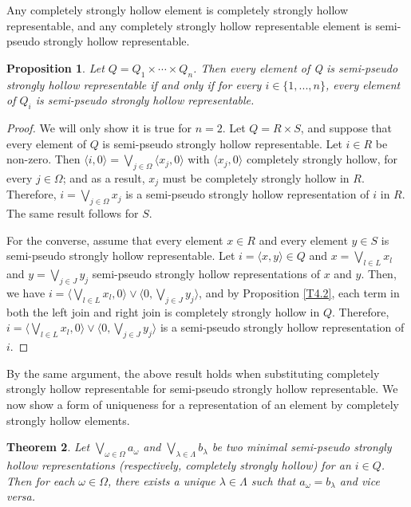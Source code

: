 \documentclass[11pt,english]{amsart}
\newtheorem{theorem}{Theorem}[section]
\newtheorem{proposition}[theorem]{Proposition}
\theoremstyle{definition}
\numberwithin{equation}{section}
\theoremstyle{remark}
\begin{document}
	Any completely strongly hollow element is completely strongly hollow representable, and any completely strongly hollow representable element is semi-pseudo strongly hollow representable.
	
	\begin{proposition}
		Let $Q=Q_1\times\cdots \times Q_n$. Then every element of Q is semi-pseudo strongly hollow representable if and only if for every $i\in\{1,...,n\}$, every element of $Q_i$ is semi-pseudo strongly hollow representable.
	\end{proposition}
	
	\begin{proof}
		We will only show it is true for $n=2$. Let $Q=R\times S$, and suppose that every element of $Q$ is semi-pseudo strongly hollow representable. Let $i\in R$ be non-zero. Then $\langle i,0\rangle=\bigvee_{j\in \Omega} \langle x_j,0\rangle $ with $\langle x_j,0\rangle$ completely strongly hollow, for every $j\in \Omega$; and as a result, $x_j$ must be completely strongly hollow in $R$. Therefore, $i=\bigvee_{j\in \Omega}x_j$ is a semi-pseudo strongly hollow representation of $i$ in $R$. The same result follows for $S$. 
		
		For the converse, assume that every element $x\in R$ and every element $y\in S$ is semi-pseudo strongly hollow representable. Let $i=\langle x,y\rangle\in Q$ and $x=\bigvee_{l\in L} x_l$ and $y=\bigvee_{j\in J} y_j$ semi-pseudo strongly hollow representations of $x$ and $y$. Then, we have  $i=\langle \bigvee_{l\in L} x_l ,0\rangle \vee\langle 0,\bigvee_{j\in J} y_j\rangle$, and by Proposition \ref{T4.2}, each term in both the left join and right join is completely strongly hollow in $Q$. Therefore, $i=\langle\bigvee_{l\in L} x_l ,0\rangle \vee\langle 0,\bigvee_{j\in J} y_j\rangle $ is a semi-pseudo strongly hollow representation of $i$.
	\end{proof}
	
	By the same argument, the above result holds when substituting completely strongly hollow representable for semi-pseudo strongly hollow representable. We now show a form of uniqueness for a representation of an element by completely strongly hollow elements.
	
	\begin{theorem}
		Let $\bigvee_{\omega\in \Omega}a_\omega$ and $\bigvee_{\lambda\in \Lambda}b_\lambda$ be two minimal semi-pseudo strongly hollow representations (respectively, completely strongly hollow) for an  $i\in Q$. Then for each $\omega\in\Omega$, there exists a unique $\lambda\in\Lambda$ such that $a_\omega=b_\lambda$ and vice versa.
	\end{theorem}
	
\end{document}
